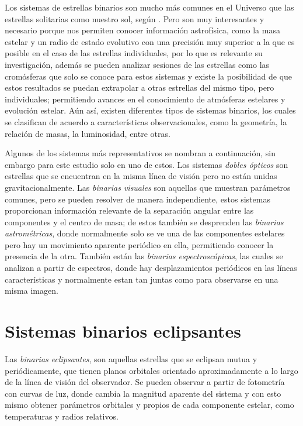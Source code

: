 \documentclass[12pt,oneside,openany,letter]{book}
\begin{document}
Los sistemas de estrellas binarios son  mucho más comunes en el Universo que las estrellas solitarias como nuestro sol, según \citep{fisher2005local}. Pero son muy interesantes y necesario porque nos permiten conocer información astrofísica, como la masa estelar y un radio de estado evolutivo con una precisión muy superior a la que es posible en el caso de las estrellas individuales, por lo que es relevante su investigación, además se pueden analizar sesiones de las estrellas como las cromósferas que solo se conoce para estos sistemas y existe la posibilidad de que estos resultados se puedan extrapolar a otras estrellas del mismo tipo, pero individuales; permitiendo avances en el conocimiento de atmósferas estelares y evolución estelar. Aún así, existen diferentes tipos de sistemas binarios, los cuales se clasifican de acuerdo a características observacionales, como la geometría, la relación de masas, la luminosidad, entre otras.

\noindent Algunos de los sistemas más representativos se nombran a continuación, sin embargo para este estudio solo en uno de estos. Los sistemas \textit{dobles ópticos} son estrellas que se encuentran en la misma línea de visión pero no están unidas gravitacionalmente.  Las \textit{binarias visuales} son aquellas que muestran parámetros comunes, pero se pueden resolver de manera independiente, estos sistemas proporcionan información relevante de la separación angular entre las componentes y el centro de masa; de estos también se desprenden las \textit{binarias astrométricas}, donde normalmente solo se ve una de las componentes estelares pero hay un movimiento aparente periódico en ella, permitiendo conocer la presencia de la otra. También están las \textit{binarias espectroscópicas}, las cuales se analizan a partir de espectros, donde hay desplazamientos periódicos en las líneas características y normalmente estan tan juntas como para observarse en una misma imagen.

\section{Sistemas binarios eclipsantes}
Las \textit{binarias eclipsantes}, son aquellas estrellas que se eclipsan mutua y periódicamente, que tienen planos orbitales orientado aproximadamente a lo largo de la línea de visión del observador. Se pueden observar a partir de fotometría con curvas de luz, donde cambia la magnitud aparente del sistema y con esto mismo obtener parámetros orbitales y propios de cada componente estelar, como temperaturas y radios relativos.
\end{document}
